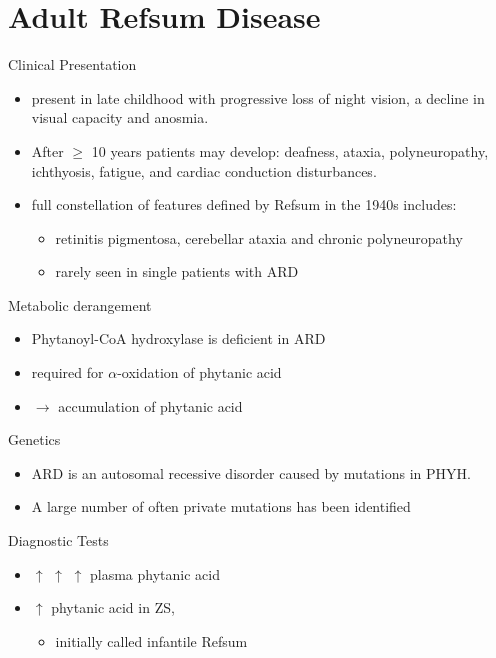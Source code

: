\documentclass[presentation, smaller]{beamer}
\begin{document}
\section{Adult Refsum Disease}
\label{sec:org51100d1}
\begin{frame}[label={sec:org1019737}]{Clinical Presentation}
\begin{itemize}
\item present in late childhood with progressive loss of night vision, a
decline in visual capacity and anosmia.
\item After \(\ge\) 10 years patients may develop: deafness, ataxia,
polyneuropathy, ichthyosis, fatigue, and cardiac conduction
disturbances.
\item full constellation of features defined by Refsum in the 1940s includes:
\begin{itemize}
\item retinitis pigmentosa, cerebellar ataxia and chronic polyneuropathy
\item rarely seen in single patients with ARD
\end{itemize}
\end{itemize}
\end{frame}
\begin{frame}[label={sec:orgf25764f}]{Metabolic derangement}
\begin{itemize}
\item Phytanoyl-CoA hydroxylase is deficient in ARD
\item required for \(\alpha\)-oxidation of phytanic acid
\item \(\to\) accumulation of phytanic acid
\end{itemize}
\end{frame}
\begin{frame}[label={sec:org7be349e}]{Genetics}
\begin{itemize}
\item ARD is an autosomal recessive disorder caused by mutations in PHYH.
\item A large number of often private mutations has been identified
\end{itemize}
\end{frame}

\begin{frame}[label={sec:org321487c}]{Diagnostic Tests}
\begin{itemize}
\item \(\uparrow\) \(\uparrow\) \(\uparrow\) plasma phytanic acid
\item \(\uparrow\) phytanic acid in ZS,
\begin{itemize}
\item initially called infantile Refsum
\end{itemize}
\end{itemize}
\end{frame}
\end{document}
